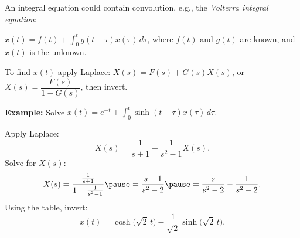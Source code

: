 \documentclass[10pt,aspectratio=169]{beamer}
\begin{document}
\begin{frame}
An integral equation could contain convolution, e.g., 
the \emph{Volterra integral equation}:

\medskip

\quad
$\displaystyle
x(t) = f(t) + \int_0^t g(t-\tau) x(\tau) \, d\tau$,
\quad 
where $f(t)$ and $g(t)$ are known,
and $x(t)$ is the unknown.

\medskip
\pause

To find $x(t)$ apply Laplace:
\quad
$X(s) = F(s) + G(s) X(s)$,
\pause
\quad
or
\quad
$X(s) = \dfrac{F(s)}{1-G(s)}$, \pause \quad then invert.

\medskip
\pause

\textbf{Example:}
Solve
\quad
$\displaystyle
x(t) =  e^{-t} + \int_0^t \sinh(t-\tau) x(\tau) \, d\tau$.

\medskip
\pause

Apply Laplace:
\[
X(s) = \frac{1}{s+1} + \frac{1}{s^2-1} X(s) .
\]
\pause
Solve for $X(s)$:
\[
X(s) = \frac{\frac{1}{s+1}}{1- \frac{1}{s^2-1}}
\pause
=
\frac{s-1}{s^2 - 2}
\pause
=
\frac{s}{s^2 - 2}
-
\frac{1}{s^2 - 2} .
\]
\pause
Using the table, invert:
\[
x(t) = \cosh \bigl( \sqrt{2} \, t \bigr) -
\frac{1}{\sqrt{2}} \sinh \bigl( \sqrt{2}\, t \bigr).
\]

\end{frame}
\end{document}
